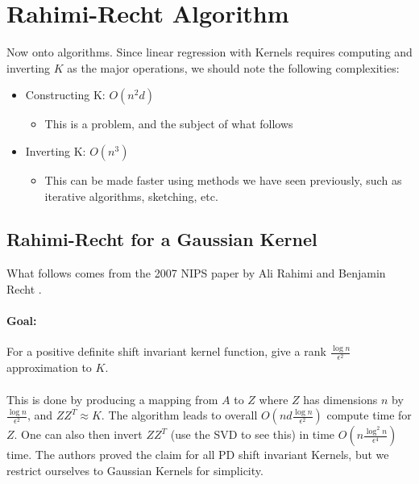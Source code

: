 \documentclass[11pt]{article}
\begin{document}
\section{Rahimi-Recht Algorithm}
Now onto algorithms. Since linear regression with Kernels requires computing and inverting $K$ as the major operations, we should note the following complexities:
\begin{itemize}
\item Constructing K: $O(n^2d)$
\begin{itemize}
    \item This is a problem, and the subject of what follows
\end{itemize}
\item Inverting K: $O(n^3)$
    \begin{itemize}
        \item This can be made faster using methods we have seen previously, such as iterative algorithms, sketching, etc.
    \end{itemize}
\end{itemize}

\subsection{Rahimi-Recht for a Gaussian Kernel}
What follows comes from the 2007 NIPS paper by Ali Rahimi and Benjamin Recht \cite{RahimiRecht07}. 
\paragraph{Goal:} For a positive definite shift invariant kernel function, give a rank $\frac{\log n}{\epsilon^2}$ approximation to $K$. 
\\\\
 This is done by producing a mapping from $A$ to $Z$ where $Z$ has dimensions $n$ by $\frac{\log n}{\epsilon^2}$, and $ZZ^T \approx K$. The algorithm leads to overall $O(nd  \frac{\log n}{\epsilon^2} )$ compute time for $Z$. One can also then invert $ZZ^T$ (use the SVD to see this) in time $O(n \frac{\log^2 n}{\epsilon^4})$ time. The authors proved the claim for all PD shift invariant Kernels, but we restrict ourselves to Gaussian Kernels for simplicity. 
\end{document}
